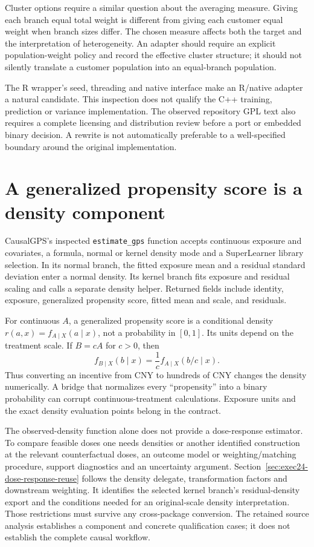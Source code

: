 Cluster options require a similar question about the averaging measure. Giving
each branch equal total weight is different from giving each customer equal
weight when branch sizes differ. The chosen measure affects both the target
and the interpretation of heterogeneity. An adapter should require an explicit
population-weight policy and record the effective cluster structure; it should
not silently translate a customer population into an equal-branch population.

The R wrapper's seed, threading and native interface make an R/native adapter
a natural candidate. This inspection does not qualify the C++ training,
prediction or variance implementation. The observed repository GPL text also
requires a complete licensing and distribution review before a port or embedded
binary decision. A rewrite is not automatically preferable to a well-specified
boundary around the original implementation. \cite{v13_sw_grf}

\section{A generalized propensity score is a density component}

CausalGPS's inspected \texttt{estimate\_gps} function accepts continuous
exposure and covariates, a formula, normal or kernel density mode and a
SuperLearner library selection. In its normal branch, the fitted exposure mean
and a residual standard deviation enter a normal density. Its kernel branch
fits exposure and residual scaling and calls a separate density helper. Returned
fields include identity, exposure, generalized propensity score, fitted mean
and scale, and residuals. \cite{v13_sw_causalgps}

For continuous $A$, a generalized propensity score is a conditional density
$r(a,x)=f_{A\mid X}(a\mid x)$, not a probability in $[0,1]$. Its units depend
on the treatment scale. If $B=cA$ for $c>0$, then
\[
 f_{B\mid X}(b\mid x)=\frac1c f_{A\mid X}(b/c\mid x).
\]
Thus converting an incentive from CNY to hundreds of CNY changes the density
numerically. A bridge that normalizes every ``propensity'' into a binary
probability can corrupt continuous-treatment calculations. Exposure units and
the exact density evaluation points belong in the contract.

The observed-density function alone does not provide a dose-response estimator.
To compare feasible doses one needs densities or another identified construction
at the relevant counterfactual doses, an outcome model or weighting/matching
procedure, support diagnostics and an uncertainty argument.
Section~\ref{sec:exec24-dose-response-reuse} follows the density delegate,
transformation factors and downstream weighting. It identifies the selected
kernel branch's residual-density export and the conditions needed for an
original-scale density interpretation. Those restrictions must survive any
cross-package conversion. The retained source analysis establishes a component
and concrete qualification cases; it does not establish the complete causal
workflow.

